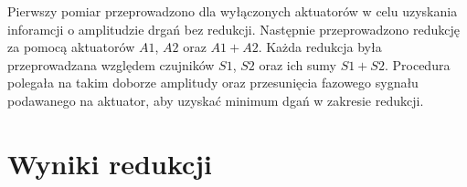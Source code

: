\documentclass[polish,a4paper,11pt]{mwart}
\let\Oldsection\section
\renewcommand{\section}{\FloatBarrier\Oldsection}
\begin{document}
  Pierwszy pomiar przeprowadzono dla wyłączonych aktuatorów w celu uzyskania
  inforamcji o amplitudzie drgań bez redukcji. Następnie przeprowadzono
  redukcję za pomocą aktuatorów $A1$, $A2$ oraz $A1+A2$. Każda redukcja była
  przeprowadzana względem czujników $S1$, $S2$ oraz ich sumy $S1+S2$.
  Procedura polegała na takim doborze amplitudy oraz
  przesunięcia fazowego sygnału podawanego na aktuator, aby uzyskać minimum
  dgań w zakresie redukcji.

  \section{Wyniki redukcji}
  
\end{document}
